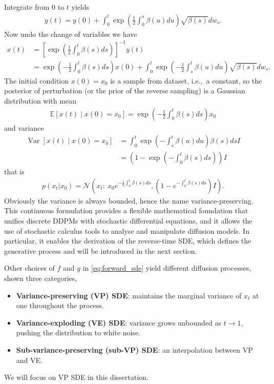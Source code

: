 \documentclass[a4paper,12pt]{article}
\DeclareMathOperator{\Var}{Var} %
\begin{document}
Integrate from \(0\) to \(t\) yields
\begin{align*}
    y\!\left(t\right)=y\!\left(0\right)+\int_0^t\exp\left(\frac{1}{2}\int_0^s\beta\!\left(u\right)du\right)\sqrt{\beta\!\left(s\right)}dw_s.
\end{align*}
Now undo the change of variables we have
\begin{align*}
    x\!\left(t\right)
    &=\left[\exp\left(\frac{1}{2}\int_0^t\beta\!\left(s\right)ds\right)\right]^{-1}y\!\left(t\right)\\
    &=\exp\left(-\frac{1}{2}\int_0^t\beta\!\left(s\right)ds\right)x\!\left(0\right)+\int_0^t\exp\left(-\frac{1}{2}\int_s^t\beta\!\left(u\right)du\right)\sqrt{\beta\!\left(s\right)}dw_s.
\end{align*}
The initial condition \(x\!\left(0\right)=x_0\) is a sample from dataset, i.e.,~a constant, so the posterior of perturbation (or the prior of the reverse sampling) is a Gaussian distribution with mean
\begin{align}\label{eq:VPSDE-solution-mean}
    \mathbb{E}\left[x\!\left(t\right)\mid x\!\left(0\right)=x_0\right]=\exp\left(-\frac{1}{2}\int_0^t\beta\!\left(s\right)ds\right)x_0
\end{align}
and variance
\begin{align}
    \nonumber
    \Var\left[x\!\left(t\right)\mid x\!\left(0\right)=x_0\right]
    &=\int_0^t\exp\left(-\int_s^t\beta\!\left(u\right)du\right)\beta\!\left(s\right)ds I\\
    \label{eq:VPSDE-solution-variance}
    &=\left(1-\exp\left(-\int_0^t\beta\!\left(s\right)ds\right)\right)I
\end{align}
that is
\begin{align}\label{eq:VPSDE-solution}
    p\!\left(x_t|x_0\right)=\mathcal{N}\left(x_t:\:x_0e^{-\frac{1}{2}\int_0^t\beta(s)ds},\left(1-e^{-\int_0^t\beta(s)ds}\right)I\right).
\end{align}
Obviously the variance is always bounded, hence the name variance-preserving. This continuous formulation provides a flexible mathematical foundation that unifies discrete DDPMs with stochastic differential equations, and it allows the use of stochastic calculus tools to analyse and manipulate diffusion models. In particular, it enables the derivation of the reverse-time SDE, which defines the generative process and will be introduced in the next section.

Other choices of \(f\) and \(g\) in \cref{eq:forward_sde} yield different diffusion processes, \citet{song2021ScoreBasedGenerativeModeling} shown three categories,
\begin{itemize}
    \item \textbf{Variance-preserving (VP) SDE}: maintains the marginal variance of \(x_t\) at one throughout the process.  
    \item \textbf{Variance-exploding (VE) SDE}: variance grows unbounded as \(t \to 1\), pushing the distribution to white noise.  
    \item \textbf{Sub-variance-preserving (sub-VP) SDE}: an interpolation between VP and VE.  
\end{itemize}
We will focus on VP SDE in this dissertation.
\end{document}
